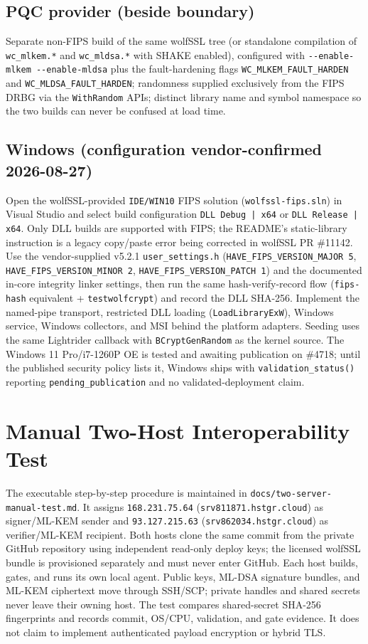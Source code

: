 \documentclass[10pt]{article}
\newcommand{\code}[1]{\texttt{\small #1}}
\begin{document}
\subsection*{PQC provider (beside boundary)}
Separate non-FIPS build of the same wolfSSL tree (or standalone compilation of
\code{wc\_mlkem.*} and \code{wc\_mldsa.*} with SHAKE enabled), configured with
\code{-{}-enable-mlkem -{}-enable-mldsa} plus the fault-hardening flags
\code{WC\_MLKEM\_FAULT\_HARDEN} and \code{WC\_MLDSA\_FAULT\_HARDEN}; randomness supplied
exclusively from the FIPS DRBG via the \code{*WithRandom} APIs; distinct library name and
symbol namespace so the two builds can never be confused at load time.

\subsection*{Windows (configuration vendor-confirmed 2026-08-27)}
Open the wolfSSL-provided \code{IDE/WIN10} FIPS solution (\code{wolfssl-fips.sln}) in
Visual Studio and select build configuration \code{DLL Debug | x64} or
\code{DLL Release | x64}. Only DLL builds are supported with FIPS; the README's
static-library instruction is a legacy copy/paste error being corrected in wolfSSL
PR \#11142. Use the vendor-supplied v5.2.1 \code{user\_settings.h}
(\code{HAVE\_FIPS\_VERSION\_MAJOR 5}, \code{HAVE\_FIPS\_VERSION\_MINOR 2},
\code{HAVE\_FIPS\_VERSION\_PATCH 1}) and the documented in-core integrity linker
settings, then run the same hash-verify-record flow (\code{fips-hash} equivalent +
\code{testwolfcrypt}) and record the DLL SHA-256. Implement the named-pipe transport,
restricted DLL loading (\code{LoadLibraryExW}), Windows service, Windows collectors, and
MSI behind the platform adapters. Seeding uses the same Lightrider callback with
\code{BCryptGenRandom} as the kernel source. The Windows 11 Pro/i7-1260P OE is tested
and awaiting publication on \#4718; until the published security policy lists it,
Windows ships with \code{validation\_status()} reporting \code{pending\_publication} and
no validated-deployment claim.

\section{Manual Two-Host Interoperability Test}\label{app:twohost}

The executable step-by-step procedure is maintained in
\code{docs/two-server-manual-test.md}. It assigns
\code{168.231.75.64} (\code{srv811871.hstgr.cloud}) as signer/ML-KEM sender and
\code{93.127.215.63} (\code{srv862034.hstgr.cloud}) as verifier/ML-KEM recipient.
Both hosts clone the same commit from the private GitHub repository using independent
read-only deploy keys; the licensed wolfSSL bundle is provisioned separately and must
never enter GitHub. Each host builds, gates, and runs its own local agent. Public keys,
ML-DSA signature bundles, and ML-KEM ciphertext move through SSH/SCP; private handles and
shared secrets never leave their owning host. The test compares shared-secret SHA-256
fingerprints and records commit, OS/CPU, validation, and gate evidence. It does not claim
to implement authenticated payload encryption or hybrid TLS.
\end{document}
